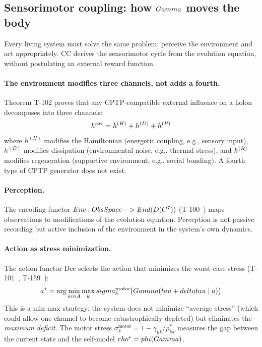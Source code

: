 \subsection{Sensorimotor coupling: how $Gamma$ moves the body}
\label{subsec:sensorimotor}

Every living system must solve the same problem: perceive the environment and act
appropriately.  CC derives the sensorimotor cycle from the evolution equation, without
postulating an external reward function.

\paragraph{The environment modifies three channels, not adds a fourth.}
Theorem T-102  proves that any CPTP-compatible external influence on a holon
decomposes into three channels:
\begin{equation}
  h^{ext} = h^{(H)} + h^{(D)} + h^{(R)}
  \label{eq:three-channels}
\end{equation}
where $h^{(H)}$ modifies the Hamiltonian (energetic coupling, e.g., sensory input),
$h^{(D)}$ modifies dissipation (environmental noise, e.g., thermal stress), and
$h^{(R)}$ modifies regeneration (supportive environment, e.g., social bonding).
A fourth type of CPTP generator does not exist.

\paragraph{Perception.}
The encoding functor $Enc: ObsSpace -> End(D(C^7))$
(T-100~) maps observations to modifications of the evolution equation.
Perception is not passive recording but active inclusion of the environment in the system's
own dynamics.

\paragraph{Action as stress minimization.}
The action functor $\mathrm{Dec}$ selects the action that minimizes the worst-case
stress (T-101~, T-159~):
\begin{equation}
  a^* = \arg\min_{a in A} \max_k sigma^{motor}_k\!\bigl(Gamma(tau + deltatau \mid a)\bigr)
  \label{eq:optimal-action}
\end{equation}
This is a min-max strategy: the system does not minimize ``average stress'' (which could
allow one channel to become catastrophically depleted) but eliminates the \emph{maximum
deficit}.  The motor stress $\sigma^{\mathrm{motor}}_k = 1 - \gamma_{kk}/\rho^*_{kk}$
measures the gap between the current state and the self-model $rho^* = phi(Gamma)$.


